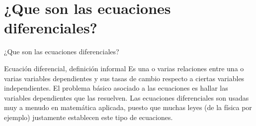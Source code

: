 \documentclass[handout,hyperref={colorlinks=true}]{beamer}
\begin{document}
\section{¿Que son las ecuaciones diferenciales?}
\begin{frame}{¿Que son las ecuaciones diferenciales?}

\begin{block}{Ecuación diferencial, definición informal}
 Es una o varias relaciones entre una o varias variables dependientes y sus tasas de cambio respecto a ciertas variables independientes. El problema básico asociado
 a las ecuaciones es hallar las variables dependientes que las resuelven. Las ecuaciones diferenciales son usadas muy a menudo en matemática aplicada, puesto que muchas 
 leyes (de la física por ejemplo) justamente establecen este tipo de ecuaciones. 
\end{block}



\end{frame}
\end{document}
